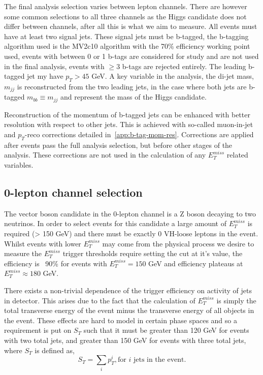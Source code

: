 The final analysis selection varies between lepton channels. There are however
some common selections to all three channels as the Higgs candidate does not
differ between channels, after all this is what we aim to measure. All events must
have at least two signal jets. These signal jets must be b-tagged, the b-tagging
algorithm used is the MV2c10 algorithm with the 70\% efficiency working point
used, events with between 0 or 1 b-tags are considered for study and are not
used in the final analysis, events with $\ge3$ b-tags are rejected entirely. The
leading b-tagged jet my have $p_T > 45$ GeV. A key variable in the analysis, the
di-jet mass, $m_{jj}$ is reconstructed from the two leading jets, in the case
where both jets are b-tagged $m_{bb} \equiv m_{jj}$ and represent the mass of
the Higgs candidate.

Reconstruction of the momentum of b-tagged jets can be enhanced with better
resolution with respect to other jets. This is achieved with so-called
muon-in-jet and $p_T$-reco corrections detailed in~\ref{app:b-tag-mom-res}.
Corrections are applied after events pass the full analysis selection, but
before other stages of the analysis. These corrections are not used in the
calculation of any $E_T^{miss}$ related variables.

\subsection{0-lepton channel selection}
\label{sec:0lep-selection}

The vector boson candidate in the 0-lepton channel is a Z boson decaying to two
neutrinos. In order to select events for this candidate a large amount of
$E_T^{miss}$ is required (> 150 GeV) and there must be exactly 0 VH-loose
leptons in the event. Whilst events with lower $E_T^{miss}$ may come from the
physical process we desire to measure the $E_T^{miss}$ trigger thresholds
require setting the cut at it's value, the efficiency is ~90\% for events
with $E_T^{miss} = 150$ GeV and efficiency plateaus at $E_T^{miss} \approx 180$
GeV.

There exists a non-trivial dependence of the trigger efficiency on activity of
jets in detector. This arises due to the fact that the calculation of
$E_T^{miss}$ is simply the total transverse energy of the event minus the
transverse energy of all objects in the event. These effects are hard to model
in certain phase spaces and so a requirement is put on $S_T$ such that it must
be greater than 120 GeV for events with two total jets, and greater than 150 GeV
for events with three total jets, where $S_T$ is defined as,
\begin{equation}
  S_T = \sum_i p_T^i, \text{for } i \text{ jets in the event.}
\end{equation}

